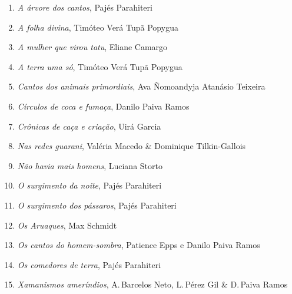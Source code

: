 \begin{enumerate}
\setlength{\topsep}{2pt}
\setlength{\partopsep}{0pt}
\setlength\parskip{4.2pt}
\setlength\itemsep{-1.4mm}
\item \textit{A árvore dos cantos}, Pajés Parahiteri
\item \textit{A folha divina}, Timóteo Verá Tupã Popygua
\item \textit{A mulher que virou tatu}, Eliane Camargo
\item \textit{A terra uma só}, Timóteo Verá Tupã Popygua
\item \textit{Cantos dos animais primordiais}, Ava Ñomoandyja Atanásio Teixeira
\item \textit{Círculos de coca e fumaça}, Danilo Paiva Ramos
\item \textit{Crônicas de caça e criação}, Uirá Garcia
\item \textit{Nas redes guarani}, Valéria Macedo \& Dominique Tilkin-Gallois
\item \textit{Não havia mais homens}, Luciana Storto
\item \textit{O surgimento da noite}, Pajés Parahiteri
\item \textit{O surgimento dos pássaros}, Pajés Parahiteri
\item \textit{Os Aruaques}, Max Schmidt
\item \textit{Os cantos do homem-sombra}, Patience Epps e Danilo Paiva Ramos
\item \textit{Os comedores de terra}, Pajés Parahiteri
\item \textit{Xamanismos ameríndios}, A.\,Barcelos Neto, L.\,Pérez Gil \& D.\,Paiva Ramos
\end{enumerate}




%


